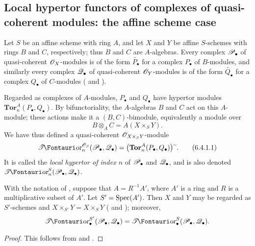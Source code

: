 \subsection{Local hypertor functors of complexes of quasi-coherent modules: the affine scheme case}
\label{subsection:III.6.4}
\label{III.6.4}

\begin{env}[6.4.1]
\label{III.6.4.1}
Let $S$ be an affine scheme with ring $A$, and let $X$ and $Y$ be
affine $S$-schemes with rings $B$ and $C$, respectively; thus $B$
and $C$ are $A$-algebras.  Every complex $\mathscr{P}_\bullet$ of
quasi-coherent $\mathscr{O}_X$-modules is of the form
$\widetilde{P_\bullet}$ for a complex $P_\bullet$ of $B$-modules,
and similarly every complex $\mathscr{Q}_\bullet$ of quasi-coherent
$\mathscr{O}_Y$-modules is of the form $\widetilde{Q_\bullet}$ for a
complex $Q_\bullet$ of $C$-modules
( and ).

Regarded as complexes of $A$-modules, $P_\bullet$ and $Q_\bullet$
have hypertor modules
$\mathbf{Tor}_n^A(P_\bullet,Q_\bullet)$.  By bifunctoriality, the
$A$-algebras $B$ and $C$ act on this $A$-module; these actions make
it a $(B,C)$-bimodule, equivalently a module over
\[
  B\otimes_AC=A(X\times_SY).
\]
We have thus defined a quasi-coherent
$\mathscr{O}_{X\times_SY}$-module
\[
  \shTor_n^{\sh O_S}(\sh P_\bullet,\sh Q_\bullet)
  =
  \bigl(\mathbf{Tor}_n^A(P_\bullet,Q_\bullet)\bigr)\supertilde.
  \tag{6.4.1.1}\label{III.6.4.1.1}
\]
It is called the \emph{local hypertor of index $n$} of
$\mathscr{P}_\bullet$ and $\mathscr{Q}_\bullet$, and is also denoted
$\shTor_n^S(\sh P_\bullet,\sh Q_\bullet)$.
\end{env}

\begin{lemma}[6.4.2]
\label{III.6.4.2}
With the notation of , suppose that
$A=R^{-1}A'$, where $A'$ is a ring and $R$ is a multiplicative
subset of $A'$.  Let $S'=\operatorname{Spec}(A')$.  Then $X$ and $Y$ may be
regarded as $S'$-schemes and
$X\times_{S'}Y=X\times_SY$
( and ); moreover,
\[
  \shTor_\bullet^{S'}(\sh P_\bullet,\sh Q_\bullet)
  =
  \shTor_\bullet^S(\sh P_\bullet,\sh Q_\bullet).
\]
\end{lemma}

\begin{proof}
This follows from  and .
\end{proof}


